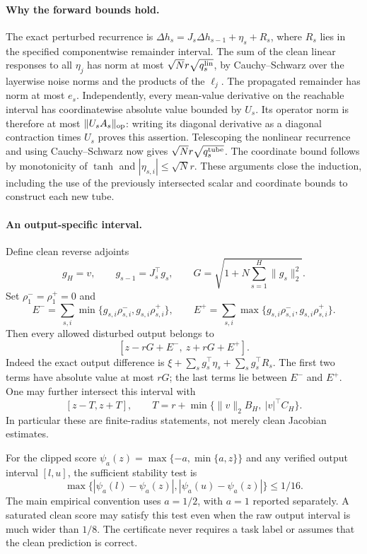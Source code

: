 \paragraph{Why the forward bounds hold.}
The exact perturbed recurrence is
$\Delta h_s=J_s\Delta h_{s-1}+\eta_s+R_s$, where $R_s$ lies in the
specified componentwise remainder interval. The sum of the clean linear
responses to all $\eta_j$ has norm at most
$\sqrt N r\sqrt{q_s^{\rm lin}}$, by Cauchy--Schwarz over the layerwise
noise norms and the products of the $\ell_j$. The propagated remainder
has norm at most $e_s$.
Independently, every mean-value derivative on the reachable interval has
coordinatewise absolute value bounded by $U_s$. Its operator norm is
therefore at most $\|U_sA_s\|_{\rm op}$: writing its diagonal derivative
as a diagonal contraction times $U_s$ proves this assertion.
Telescoping the nonlinear recurrence and using Cauchy--Schwarz now gives
$\sqrt N r\sqrt{q_s^{\rm tube}}$. The coordinate bound follows by
monotonicity of $\tanh$ and $|\eta_{s,i}|\le\sqrt N r$.
These arguments close the induction, including the use of the previously
intersected scalar and coordinate bounds to construct each new tube.

\paragraph{An output-specific interval.}
Define clean reverse adjoints
\[
 g_H=v,\qquad g_{s-1}=J_s^\top g_s,
 \qquad G=\sqrt{1+N\sum_{s=1}^H\|g_s\|_2^2}.
\]
Set $\rho_1^-=\rho_1^+=0$ and
\[
 E^- =\sum_{s,i}\min\{g_{s,i}\rho^-_{s,i},g_{s,i}\rho^+_{s,i}\},\qquad
 E^+ =\sum_{s,i}\max\{g_{s,i}\rho^-_{s,i},g_{s,i}\rho^+_{s,i}\}.
\]
Then every allowed disturbed output belongs to
\begin{equation}\label{eq:reachable-output-interval}
 [z-rG+E^-,\ z+rG+E^+].
\end{equation}
Indeed the exact output difference is
$\xi+\sum_sg_s^\top\eta_s+\sum_sg_s^\top R_s$.
The first two terms have absolute value at most $rG$; the last terms lie
between $E^-$ and $E^+$. One may further intersect this interval with
\[
 [z-T,z+T],\qquad
 T=r+\min\{\|v\|_2B_H,\ |v|^\top C_H\}.
\]
In particular these are finite-radius statements, not merely clean
Jacobian estimates.

For the clipped score $\psi_a(z)=\max\{-a,\min\{a,z\}\}$ and any verified
output interval $[l,u]$, the sufficient stability test is
\[
 \max\{|\psi_a(l)-\psi_a(z)|,|\psi_a(u)-\psi_a(z)|\}\le1/16.
\]
The main empirical convention uses $a=1/2$, with $a=1$ reported separately.
A saturated clean score may satisfy this test even when the raw output
interval is much wider than $1/8$. The certificate never requires a task
label or assumes that the clean prediction is correct.

